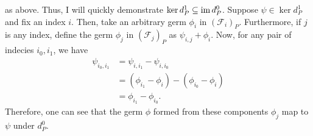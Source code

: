 as above. Thus, I will quickly demonstrate
$\ker d^{1}_{P}\subseteq\operatorname{im} d^{0}_{P}$. Suppose $\psi\in\ker d^{1}_{P}$ and fix
an index $i$. Then, take an arbitrary germ $\phi_{i}$
in $\left(\mathscr{F}_{i}\right)_{P}$. Furthermore, if $j$ is any index,
define the germ $\phi_{j}$ in $\left(\mathscr{F}_{j}\right)_{P}$ as
$\psi_{i,j}+\phi_{i}$. Now, for any pair of indecies $i_{0},i_{1}$, we have
\begin{align*}
  \psi_{i_{0},i_{1}}
  &=\psi_{i,i_{1}}-\psi_{i,i_{0}} \\
  &=\left(\phi_{i_{1}}-\phi_{i}\right)-\left(\phi_{i_{0}}-\phi_{i}\right) \\
  &=\phi_{i_{1}}-\phi_{i_{0}}.
\end{align*}
Therefore, one can see that the germ $\phi$ formed from these components
$\phi_{j}$ map to $\psi$ under $d^{0}_{P}$.

